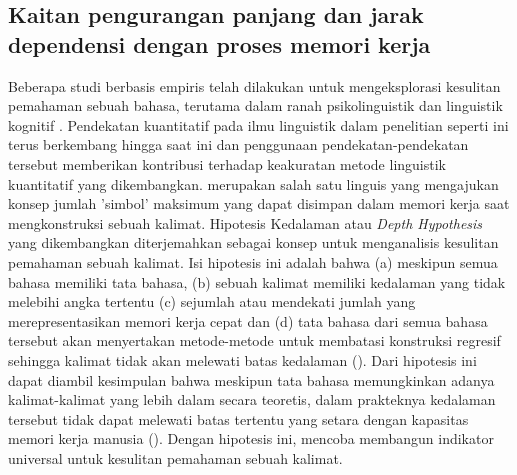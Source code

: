 \subsection{Kaitan pengurangan panjang dan jarak dependensi dengan proses memori kerja}
Beberapa studi berbasis empiris telah dilakukan untuk mengeksplorasi kesulitan pemahaman sebuah bahasa, terutama dalam ranah psikolinguistik dan linguistik kognitif \citep{jay2003psychology}. Pendekatan kuantitatif pada ilmu linguistik dalam penelitian seperti ini terus berkembang hingga saat ini dan penggunaan pendekatan-pendekatan tersebut memberikan kontribusi terhadap keakuratan metode linguistik kuantitatif yang dikembangkan. \cite{yngve1960model} merupakan salah satu linguis yang mengajukan konsep jumlah 'simbol' maksimum yang dapat disimpan dalam memori kerja saat mengkonstruksi sebuah kalimat. Hipotesis Kedalaman atau \textit{Depth Hypothesis} yang dikembangkan \cite{yngve1960model} diterjemahkan sebagai konsep untuk menganalisis kesulitan pemahaman sebuah kalimat. Isi hipotesis ini adalah bahwa (a) meskipun semua bahasa memiliki tata bahasa, (b) sebuah kalimat memiliki kedalaman yang tidak melebihi angka tertentu (c) sejumlah atau mendekati jumlah yang merepresentasikan memori kerja cepat dan (d) tata bahasa dari semua bahasa tersebut akan menyertakan metode-metode untuk membatasi konstruksi regresif sehingga kalimat tidak akan melewati batas kedalaman (\citealp{yngve1960model, yngve1996grammar}). Dari hipotesis ini dapat diambil kesimpulan bahwa meskipun tata bahasa memungkinkan adanya kalimat-kalimat yang lebih dalam secara teoretis, dalam prakteknya kedalaman tersebut tidak dapat melewati batas tertentu yang setara dengan kapasitas memori kerja manusia (\citealp{miller1956magical,cowan2001metatheory}). Dengan hipotesis ini, \cite{yngve1960model} mencoba membangun indikator universal untuk kesulitan pemahaman sebuah kalimat. 

